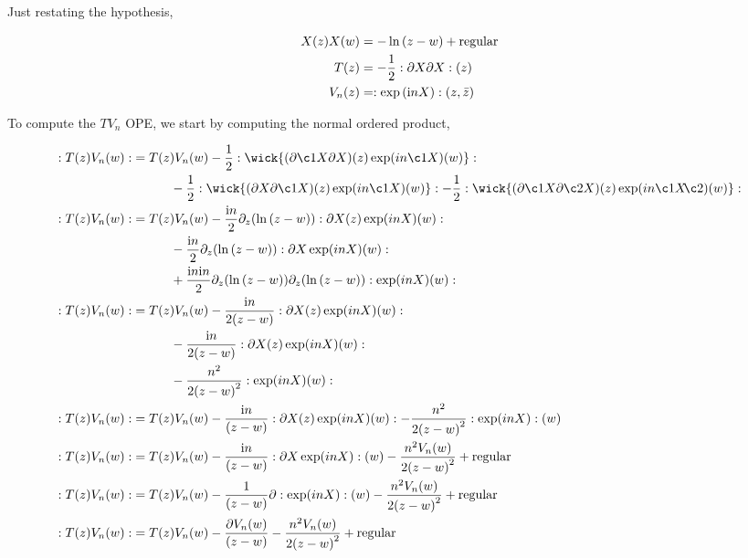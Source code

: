 \problem{}
\probitem{}

Just restating the hypothesis,

\begin{align*}
    X\qty(z)X\qty(w)&=-\ln\qty(z-w)+\textnormal{regular}\\
    T\qty(z)&=-\frac12:\partial X\partial X:\qty(z)\\
    V_n\qty(z)&=:\exp\qty(\textnormal{i} n X):\qty(z,\bar z)
\end{align*}

To compute the $TV_n$ OPE, we start by computing the normal ordered product,

\begin{align*}
    \cnord{T\qty(z)V_n\qty(w)}&=T\qty(z)V_n\qty(w)-\frac12\cnord{\wick{(\partial \c1X\partial X)\qty(z)\exp(in \c1X)\qty(w)}}\\
    &\quad\quad\quad-\frac12\cnord{\wick{(\partial X\partial \c1X)\qty(z)\exp(in \c1X)\qty(w)}}-\frac12\cnord{\wick{(\partial \c1X\partial\c2 X)\qty(z)\exp(in \c1 X\mkern-4mu \c2 {\mathclap{\phantom{X}}})\qty(w)}}\\
    \cnord{T\qty(z)V_n\qty(w)}&=T\qty(z)V_n\qty(w)-\frac{\im n}{2}\partial_z\qty(\ln\qty(z-w))\cnord{\partial X\qty(z)\exp(in X)\qty(w)}\\
    &\quad\quad\quad-\frac{\im n}{2}\partial_z\qty(\ln\qty(z-w))\cnord{\partial X\exp(in X)\qty(w)}\\
    &\quad\quad\quad+\frac{\im n \im n}{2}\partial_z\qty(\ln\qty(z-w))\partial_z\qty(\ln\qty(z-w))\cnord{\exp(in X)\qty(w)}\\
    \cnord{T\qty(z)V_n\qty(w)}&=T\qty(z)V_n\qty(w)-\frac{\im n}{2\qty(z-w)}\cnord{\partial X\qty(z)\exp(in X)\qty(w)}\\
    &\quad\quad\quad-\frac{\im n}{2\qty(z-w)}\cnord{\partial X\qty(z)\exp(in X)\qty(w)}\\
    &\quad\quad\quad-\frac{n^2}{2\qty(z-w)^2}\cnord{\exp(in X)\qty(w)}\\
    \cnord{T\qty(z)V_n\qty(w)}&=T\qty(z)V_n\qty(w)-\frac{\im n}{\qty(z-w)}\cnord{\partial X\qty(z)\exp(in X)\qty(w)}-\frac{n^2}{2\qty(z-w)^2}\cnord{\exp(in X)}\qty(w)\\
    \cnord{T\qty(z)V_n\qty(w)}&=T\qty(z)V_n\qty(w)-\frac{\im n}{\qty(z-w)}\cnord{\partial X\exp(in X)}\qty(w)-\frac{n^2V_n\qty(w)}{2\qty(z-w)^2}+\textnormal{regular}\\
    \cnord{T\qty(z)V_n\qty(w)}&=T\qty(z)V_n\qty(w)-\frac{1}{\qty(z-w)}\partial\cnord{\exp(in X)}\qty(w)-\frac{n^2V_n\qty(w)}{2\qty(z-w)^2}+\textnormal{regular}\\
    \cnord{T\qty(z)V_n\qty(w)}&=T\qty(z)V_n\qty(w)-\frac{\partial V_n\qty(w)}{\qty(z-w)}-\frac{n^2V_n\qty(w)}{2\qty(z-w)^2}+\textnormal{regular}
\end{align*}

